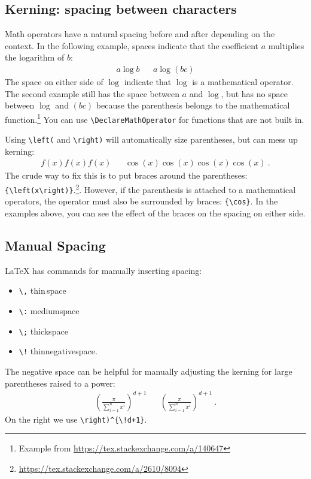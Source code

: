 \subsection{Kerning: spacing between characters}
Math operators have a natural spacing before and after depending on the context. In the following example, spaces indicate that the coefficient $a$ multiplies the logarithm of $b$:
\begin{align}
	a\log b && a\log(bc)
\end{align}
The space on either side of $\log$ indicate that $\log$ is a mathematical operator. The second example still has the space between $a$ and $\log$, but has no space between $\log$ and $(bc)$ because the parenthesis belongs to the mathematical function.\footnote{Example from \url{https://tex.stackexchange.com/a/140647}}
% 
You can use \verb!\DeclareMathOperator! for functions that are not built in.

Using \verb!\left(! and \verb!\right)! will automatically size parentheses, but can mess up kerning:
\begin{align}
	f(x)
	f\left(x\right)
	f{\left(x\right)}
	&
	&
	\cos(x)
	\cos\left(x\right)
	\cos{\left(x\right)}
	{\cos}{\left(x\right)}
	\ .
\end{align}
The crude way to fix this is to put braces around the parentheses: \verb!{\left(x\right)}!.\footnote{\url{https://tex.stackexchange.com/a/2610/8094}}. However, if the parenthesis is attached to a mathematical operators, the operator must also be surrounded by braces: \verb!{\cos}!. In the examples above, you can see the effect of the braces on the spacing on either side.



\subsection{Manual Spacing}

\LaTeX{} has commands for manually inserting spacing: 
\begin{itemize}
	\item \verb!\,! thin\,space
	\item \verb!\:! medium\:space
	\item \verb!\;! thick\;space
	\item \verb$\!$ thin\!negative\!space.
\end{itemize}
The negative space can be helpful for manually adjusting the kerning for large parentheses raised to a power:
\begin{align}
	\left(\frac{\pi}{\sum_{i=1}^n x^i}\right)^{d+1}
	&&
	\left(\frac{\pi}{\sum_{i=1}^n x^i}\right)^{\!d+1}
	\ .
\end{align}
On the right we use \verb$\right)^{\!d+1}$.



